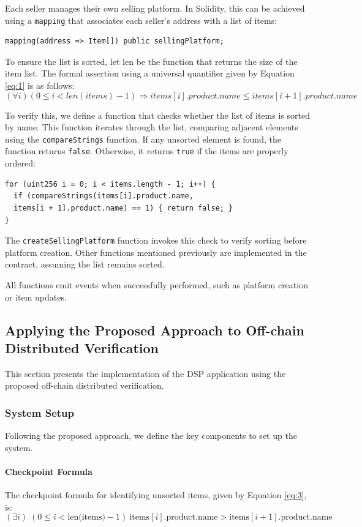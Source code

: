 \documentclass[runningheads]{llncs}
\begin{document}
Each seller manages their own selling platform. In Solidity, this can be achieved using a \texttt{mapping} that associates each seller's address with a list of items:

\begin{lstlisting}[numbers=none]
mapping(address => Item[]) public sellingPlatform;
\end{lstlisting}

To ensure the list is sorted, let \( \text{len} \) be the function that returns the size of the item list. The formal assertion using a universal quantifier given by Equation \ref{eq:1} is as follows:
\[
(\forall i) (0 \leq i < len(items) - 1) \Rightarrow items[i].product.name \leq items[i+1].product.name
\]

To verify this, we define a function that checks whether the list of items is sorted by name. This function iterates through the list, comparing adjacent elements using the \texttt{compareStrings} function. If any unsorted element is found, the function returns \texttt{false}. Otherwise, it returns \texttt{true} if the items are properly ordered:
\begin{lstlisting}[numbers=none]
for (uint256 i = 0; i < items.length - 1; i++) {
  if (compareStrings(items[i].product.name, 
  items[i + 1].product.name) == 1) { return false; }
}
\end{lstlisting}
The \texttt{createSellingPlatform} function invokes this check to verify sorting before platform creation. Other functions mentioned previously are implemented in the contract, assuming  the list remains sorted.

All functions emit events when successfully performed, such as platform creation or item updates.
\subsection{Applying the Proposed Approach to Off-chain Distributed Verification}
This section presents the implementation of the DSP application using the proposed off-chain distributed verification.
\subsubsection{System Setup}
Following the proposed approach, we define the key components to set up the system. 
\paragraph{Checkpoint Formula}
The checkpoint formula for identifying unsorted items, given by Equation \ref{eq:3}, is:
\[
(\exists i) \; (0 \leq i < \text{len(items)} - 1) \ \text{items}[i].\text{product.name} > \text{items}[i+1].\text{product.name}
\]
\end{document}

